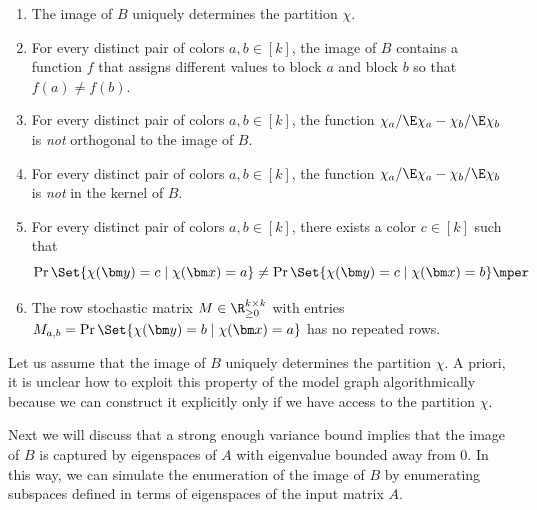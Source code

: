 \begin{enumerate}
\item The image of \(B\) uniquely determines the partition \(\chi\).
\item For every distinct pair of colors \(a,b\in [k]\), the image of \(B\) contains a function \(f\) that assigns different values to block \(a\) and block \(b\) so that \(f(a)\neq f(b)\).
\item For every distinct pair of colors \(a,b\in [k]\), the function \(\chi_{a}/\E\chi_{a}-\chi_{b}/\E\chi_{b}\) is \emph{not} orthogonal to the image of \(B\).
\item For every distinct pair of colors \(a,b\in [k]\), the function \(\chi_{a}/\E\chi_{a}-\chi_{b}/\E\chi_{b}\) is \emph{not} in the kernel of \(B\).
\item For every distinct pair of colors \(a,b\in [k]\), there exists a color \(c\in [k]\) such that
  \begin{equation}
    \Pr\Set{\chi(\bm y)=c \mid \chi(\bm x)=a}
    \neq \Pr\Set{\chi(\bm y)=c \mid \chi(\bm x)=b}
    \mper
  \end{equation}
\item The row stochastic matrix \(M\in\R_{\ge 0}^{k\times k}\) with entries \(M_{a,b}=\Pr\Set{\chi(\bm y)=b \mid \chi(\bm x)=a}\) has no repeated rows.
\end{enumerate}

Let us assume that the image of \(B\) uniquely determines the partition \(\chi\).
A priori, it is unclear how to exploit this property of the model graph algorithmically because we can construct it explicitly only if we have access to the partition \(\chi\).

Next we will discuss that a strong enough variance bound implies that the image of \(B\) is captured by eigenspaces of \(A\) with eigenvalue bounded away from \(0\).
In this way, we can simulate the enumeration of the image of \(B\) by enumerating subspaces defined in terms of eigenspaces of the input matrix \(A\).

